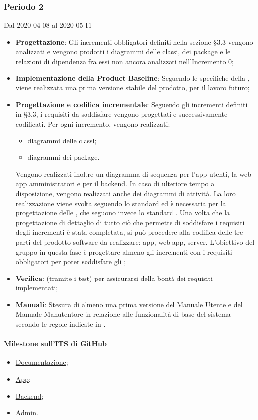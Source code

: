 \subsubsection{Periodo 2} 
Dal 2020-04-08 al 2020-05-11
\begin{itemize}
	\item \textbf{Progettazione}: Gli incrementi obbligatori definiti nella sezione §3.3 vengono analizzati e vengono prodotti i diagrammi delle classi, dei package e le relazioni di dipendenza fra essi non ancora analizzati nell'Incremento 0;
	\item \textbf{Implementazione della Product Baseline}: Seguendo le specifiche della , viene realizzata una prima versione stabile del prodotto,  per il lavoro futuro;
	\item \textbf{Progettazione e codifica incrementale}: Seguendo gli incrementi definiti in §3.3, i requisiti da soddisfare vengono progettati e successivamente codificati. Per ogni incremento, vengono realizzati:
	\begin{itemize}
		\item diagrammi delle classi;
		\item diagrammi dei package.
	\end{itemize}
	Vengono realizzati inoltre un diagramma di sequenza per l'app utenti, la web-app amministratori e per il backend. In caso di ulteriore tempo a disposizione, vengono realizzati anche dei diagrammi di attività.
	La loro realizzazione viene svolta seguendo lo standard  ed è necessaria per la progettazione delle , che seguono invece lo standard .
	Una volta che la progettazione di dettaglio di tutto ciò che permette di soddisfare i requisiti degli incrementi è stata completata, si può procedere alla codifica delle tre parti del prodotto software da realizzare: app, web-app, server.
	L'obiettivo del gruppo in questa fase è progettare almeno gli incrementi con i requisiti obbligatori per poter soddisfare gli ;
	\item \textbf{Verifica}:  (tramite i test) per assicurarsi della bontà dei requisiti implementati;
	\item \textbf{Manuali}: Stesura di almeno una prima versione del Manuale Utente e del Manuale Manutentore in relazione alle funzionalità di base del sistema secondo le regole indicate in \NdP{}.
\end{itemize}
\paragraph{Milestone sull'ITS di GitHub}
\begin{itemize}
	\item \href{https://github.com/qb-team/Stalker-Documentazione/milestone/12}{Documentazione};
	\item \href{https://github.com/qb-team/Stalker-App/milestone/2}{App};
	\item \href{https://github.com/qb-team/Stalker-Backend/milestone/2}{Backend};
	\item \href{https://github.com/qb-team/Stalker-Admin/milestone/2}{Admin}.
\end{itemize}

